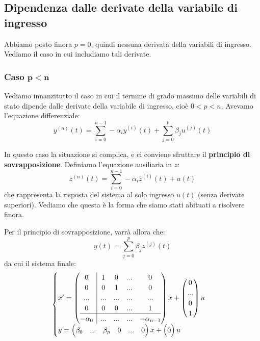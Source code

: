 \documentclass[a4paper,11pt]{article}
\begin{document}
\subsection{Dipendenza dalle derivate della variabile di ingresso}
Abbiamo posto finora $p = 0$, quindi nessuna derivata della variabili di ingresso.
Vediamo il caso in cui includiamo tali derivate.

\subsubsection{Caso $\mathbf{p < n}$}
Vediamo innanzitutto il caso in cui il termine di grado massimo delle variabili di stato dipende dalle derivate della variabile di ingresso, cioè $0 < p < n$.
Avevamo l'equazione differenziale:
$$
y^{(n)} (t) = \sum_{i=0}^{n-1} - \alpha_i y^{(i)}(t) + \sum_{j=0}^p \beta_j u^{(j)}(t)
$$

In questo caso la situazione si complica, e ci conviene sfruttare il \textbf{principio di sovrapposizione}.
Definiamo l'equazione ausiliaria in $z$:
$$
z^{(n)}(t) = \sum_{i = 0}^{n - 1} -\alpha_i z^{(i)}(t) + u(t)
$$
che rappresenta la risposta del sistema al solo ingresso $u(t)$ (senza derivate superiori).
Vediamo che questa è la forma che siamo stati abituati a risolvere finora.

Per il principio di sovrapposizione, varrà allora che:
$$
y(t) = \sum_{j = 0}^{p} \beta_j z^{(j)}(t)
$$
da cui il sistema finale:
\[
	\begin{cases}	
x' = \left(\begin{array}{@{}c | cccc@{}}
	0 & 1 & 0 & ... & 0 \\
	0 & 0 & 1 & ... & 0 \\
	... & ... & ... & ... & ... \\
	0 & 0 & 0 & ... & 1 \\
	\hline
	-\alpha_0 & ... & ... & ... & -\alpha_{n - 1}
\end{array}\right)
x + \begin{pmatrix}
0 \\
... \\
0 \\
1
\end{pmatrix} u \\ 
y = \begin{pmatrix}
	\beta_0 & ... & \beta_p & 0 & ... & 0
\end{pmatrix} x + \begin{pmatrix}
0
\end{pmatrix} u
	\end{cases}
\]
\end{document}
